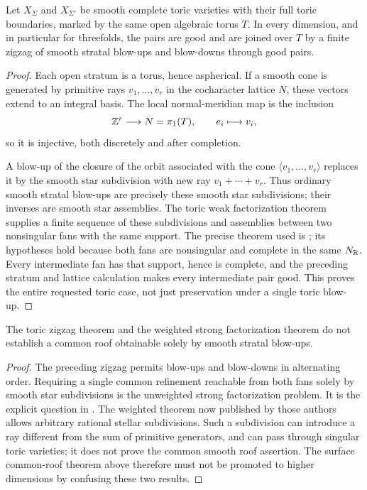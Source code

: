 \begin{theorem}
\label{P3c-toric}
Let $X_\Sigma$ and $X_{\Sigma'}$ be smooth complete toric
varieties with their full toric boundaries, marked by the
same open algebraic torus $T$. In every dimension, and in
particular for threefolds, the pairs are good and are joined
over $T$ by a finite zigzag of smooth stratal blow-ups and
blow-downs through good pairs.
\end{theorem}
\begin{proof}
Each open stratum is a torus, hence aspherical. If a smooth
cone is generated by primitive rays $v_1,\ldots,v_r$ in the
cocharacter lattice $N$, these vectors extend to an integral
basis. The local normal-meridian map is the inclusion
\[
 \mathbb Z^r\longrightarrow N=\pi _1(T),\qquad e_i\longmapsto v_i,
\]
so it is injective, both discretely and after completion.

A blow-up of the closure of the orbit associated with the
cone $\langle v_1,\ldots,v_r\rangle$ replaces it by the smooth
star subdivision with new ray $v_1+\cdots+v_r$. Thus ordinary
smooth stratal blow-ups are precisely these smooth star
subdivisions; their inverses are smooth star assemblies.
The toric weak factorization theorem supplies a finite
sequence of these subdivisions and assemblies between two
nonsingular fans with the same support. The precise theorem
used is \citet[Theorem 4.7.1]{Wlodarczyk2009}; its hypotheses
hold because both fans are nonsingular and complete in the
same $N_\mathbb R$. Every intermediate fan has that support, hence
is complete, and the preceding stratum and lattice calculation
makes every intermediate pair good. This proves the entire
requested toric case, not just preservation under a single
toric blow-up.
\end{proof}

\begin{proposition}\label{P3c-weak-strong}
The toric zigzag theorem and the weighted strong factorization
theorem do not establish a common roof obtainable solely by
smooth stratal blow-ups.
\end{proposition}
\begin{proof}
The preceding zigzag permits blow-ups and blow-downs in
alternating order. Requiring a single common refinement
reachable from both fans solely by smooth star subdivisions
is the unweighted strong factorization problem. It is the
explicit question in
\citet[arXiv version 2, Section 7.1, Question 7.1]{AdiprasitoPak2026}.
The weighted theorem now published by those authors allows
arbitrary rational stellar subdivisions. Such a subdivision
can introduce a ray different from the sum of primitive
generators, and can pass through singular toric varieties;
it does not prove the common smooth roof assertion. The
surface common-roof theorem above therefore must not be
promoted to higher dimensions by confusing these two results.
\end{proof}

